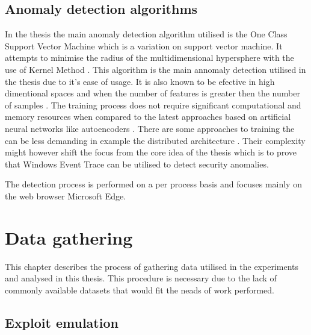 \documentclass[a4paper,twoside,12pt]{book}
\begin{document}
\section{Anomaly detection algorithms}
In the thesis the main anomaly detection algorithm utilised is the One Class Support 
Vector Machine which is a variation on support vector machine. It attempts to minimise 
the radius of the multidimensional hypersphere with the use of Kernel Method \cite{bib:ocsvm}. 
This algorithm is the main annomaly detection utilised in the thesis due to it's ease of
usage. It is also known to be efective in high dimentional spaces and when 
the number of features is greater then the number of samples \cite{bib:svms}. The training process 
does not require significant computational and memory resources when compared to the latest
approaches based on artificial neural networks like autoencoders \cite{bib:autoencoder}. There are
some approaches to training the can be less demanding in example the distributed architecture
\cite{bib:autoencoderDist}. Their complexity might however shift the focus from the core idea 
of the thesis which is to prove that Windows Event Trace can be utilised to detect security
anomalies. 

The detection process is performed on a per process basis and focuses mainly on the web browser
Microsoft Edge.  

\chapter{Data gathering}

This chapter describes the process of gathering data utilised in the experiments and 
analysed in this thesis. This procedure is necessary due to the lack of commonly available 
datasets that would fit the neads of work performed. 

\section{Exploit emulation}
\end{document}
